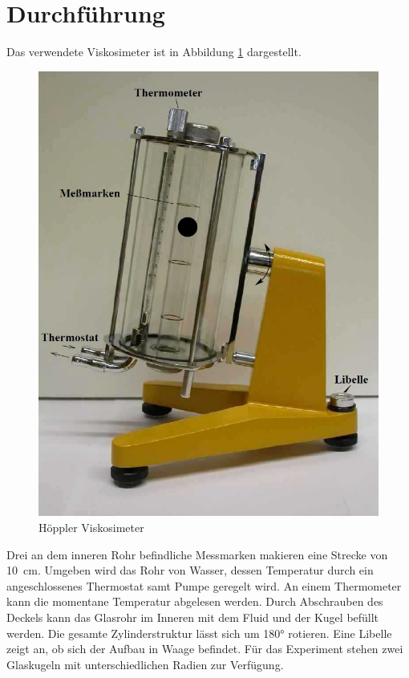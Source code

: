 \section{Durchführung}

Das verwendete Viskosimeter ist in Abbildung \ref{fig:Aufbau} dargestellt. 

\begin{figure}
\center
\includegraphics[scale=0.3]{content/Aufbau.jpg}
\caption{Höppler Viskosimeter}
\label{fig:Aufbau}
\end{figure}

Drei an dem inneren Rohr befindliche Messmarken makieren eine Strecke 
von \SI{10}{\centi\meter}. Umgeben wird das Rohr von Wasser, dessen 
Temperatur durch ein angeschlossenes Thermostat samt Pumpe geregelt wird. 
An einem Thermometer kann die momentane Temperatur abgelesen werden. 
Durch Abschrauben des Deckels kann das Glasrohr im Inneren mit dem Fluid und 
der Kugel befüllt werden. Die gesamte Zylinderstruktur lässt sich um 
180° rotieren. Eine Libelle zeigt an, ob sich der Aufbau in Waage
befindet. Für das Experiment stehen zwei Glaskugeln mit unterschiedlichen
Radien zur Verfügung. 

